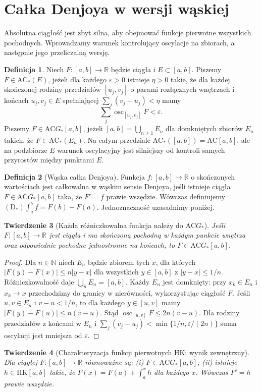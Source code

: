 \documentclass[11pt,a4paper]{article}
\numberwithin{equation}{section}
\theoremstyle{plain}
\newtheorem{twierdzenie}{Twierdzenie}[section]
\theoremstyle{definition}
\newtheorem{definicja}[twierdzenie]{Definicja}
\theoremstyle{remark}
\newcommand{\R}{\mathbb R}
\newcommand{\N}{\mathbb N}
\newcommand{\osc}{\operatorname{osc}}
\newcommand{\AC}{\mathrm{AC}}
\newcommand{\HK}{\mathrm{HK}}
\begin{document}
\section{Całka Denjoya w wersji wąskiej}
Absolutna ciągłość jest zbyt silna, aby obejmować funkcje pierwotne wszystkich pochodnych. Wprowadzamy warunek kontrolujący oscylacje na zbiorach, a następnie jego przeliczalną wersję.
\begin{definicja}
Niech $F:[a,b]\to\R$ będzie ciągła i $E\subset[a,b]$. Piszemy $F\in\AC_*(E)$, jeżeli dla każdego $\varepsilon>0$ istnieje $\eta>0$ takie, że dla każdej skończonej rodziny przedziałów $[u_j,v_j]$ o parami rozłącznych wnętrzach i końcach $u_j,v_j\in E$ spełniającej $\sum_j(v_j-u_j)<\eta$ mamy
\[
\sum_j\osc_{[u_j,v_j]}F<\varepsilon.
\]
Piszemy $F\in\AC G_*[a,b]$, jeżeli $[a,b]=\bigcup_{n\ge1}E_n$ dla domkniętych zbiorów $E_n$ takich, że $F\in\AC_*(E_n)$. Na całym przedziale $\AC_*([a,b])=\AC[a,b]$, ale na podzbiorze $E$ warunek oscylacyjny jest silniejszy od kontroli samych przyrostów między punktami $E$.
\end{definicja}
\begin{definicja}[Wąska całka Denjoya]
Funkcja $f:[a,b]\to\R$ o skończonych wartościach jest całkowalna w wąskim sensie Denjoya, jeśli istnieje ciągła $F\in\AC G_*[a,b]$ taka, że $F'=f$ prawie wszędzie. Wówczas definiujemy $(\mathrm D_*)\int_a^b f=F(b)-F(a)$. Jednoznaczność uzasadnimy poniżej.
\end{definicja}
\begin{twierdzenie}[Każda różniczkowalna funkcja należy do $\AC G_*$]
Jeśli $F:[a,b]\to\R$ jest ciągła i ma skończoną pochodną w każdym punkcie wnętrza oraz odpowiednie pochodne jednostronne na końcach, to $F\in\AC G_*[a,b]$.
\end{twierdzenie}
\begin{proof}
Dla $n\in\N$ niech $E_n$ będzie zbiorem tych $x$, dla których $|F(y)-F(x)|\le n|y-x|$ dla wszystkich $y\in[a,b]$ z $|y-x|\le1/n$. Różniczkowalność daje $\bigcup_nE_n=[a,b]$. Każdy $E_n$ jest domknięty: przy $x_k\in E_n$ i $x_k\to x$ przechodzimy do granicy w nierówności, wykorzystując ciągłość $F$. Jeśli $u,v\in E_n$ i $v-u<1/n$, to dla każdego $y\in[u,v]$ mamy $|F(y)-F(u)|\le n(v-u)$. Stąd $\osc_{[u,v]}F\le2n(v-u)$. Dla rodziny przedziałów z końcami w $E_n$ i $\sum_j(v_j-u_j)<\min\{1/n,\varepsilon/(2n)\}$ suma oscylacji jest mniejsza od $\varepsilon$.
\end{proof}
\begin{twierdzenie}[Charakteryzacja funkcji pierwotnych HK; wynik zewnętrzny]
Dla ciągłej $F:[a,b]\to\R$ równoważne są: (i) $F\in\AC G_*[a,b]$; (ii) istnieje $h\in\HK[a,b]$ takie, że $F(x)=F(a)+\int_a^x h$ dla każdego $x$. Wówczas $F'=h$ prawie wszędzie.
\end{twierdzenie}
\end{document}
